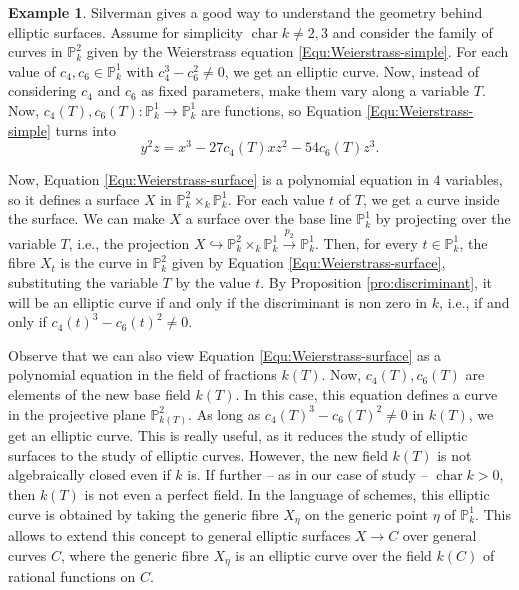 \documentclass{report}
\DeclareMathOperator{\chara}{char}
\theoremstyle{definition}
\newtheorem{example}[theorem]{Example}
\begin{document}
\begin{example}
Silverman \cite[Section~III.1]{silverman1994advanced} gives a good way to understand the geometry behind elliptic surfaces. Assume for simplicity $\chara k\neq2,3$ and consider the family of curves in $\mathbb{P}_k^2$ given by the Weierstrass equation \eqref{Equ:Weierstrass-simple}. For each value of $c_4,c_6\in\mathbb{P}_k^1$ with $c_4^3-c_6^2\neq0$, we get an elliptic curve. Now, instead of considering $c_4$ and $c_6$ as fixed parameters, make them vary along a variable $T$. Now, $c_4(T),c_6(T):\mathbb{P}_k^1\rightarrow\mathbb{P}_k^1$ are functions, so Equation \eqref{Equ:Weierstrass-simple} turns into
\begin{equation}
\label{Equ:Weierstrass-surface}
y^2z=x^3-27c_4(T)xz^2-54c_6(T)z^3.
\end{equation}

Now, Equation \eqref{Equ:Weierstrass-surface} is a polynomial equation in $4$ variables, so it defines a surface $X$ in $\mathbb{P}_k^2\times_k\mathbb{P}_k^1$. For each value $t$ of $T$, we get a curve inside the surface. We can make $X$ a surface over the base line $\mathbb{P}_k^1$ by projecting over the variable $T$, i.e., the projection $X\hookrightarrow\mathbb{P}_k^2\times_k\mathbb{P}_k^1\xrightarrow{p_2}\mathbb{P}_k^1$. Then, for every $t\in\mathbb{P}_k^1$, the fibre $X_t$ is the curve in $\mathbb{P}_k^2$ given by Equation \eqref{Equ:Weierstrass-surface}, substituting the variable $T$ by the value $t$. By Proposition \ref{pro:discriminant}, it will be an elliptic curve if and only if the discriminant is non zero in $k$, i.e., if and only if $c_4(t)^3-c_6(t)^2\neq0$.

Observe that we can also view Equation \eqref{Equ:Weierstrass-surface} as a polynomial equation in the field of fractions $k(T)$. Now, $c_4(T),c_6(T)$ are elements of the new base field $k(T)$. In this case, this equation defines a curve in the projective plane $\mathbb{P}_{k(T)}^2$. As long as $c_4(T)^3-c_6(T)^2\neq0$ in $k(T)$, we get an elliptic curve. This is really useful, as it reduces the study of elliptic surfaces to the study of elliptic curves. However, the new field $k(T)$ is not algebraically closed even if $k$ is. If further -- as in our case of study -- $\chara k>0$, then $k(T)$ is not even a perfect field. In the language of schemes, this elliptic curve is obtained by taking the generic fibre $X_{\eta}$ on the generic point $\eta$ of $\mathbb{P}_k^1$. This allows to extend this concept to general elliptic surfaces $X\rightarrow C$ over general curves $C$, where the generic fibre $X_{\eta}$ is an elliptic curve over the field $k(C)$ of rational functions on $C$.
\end{example}
\end{document}
